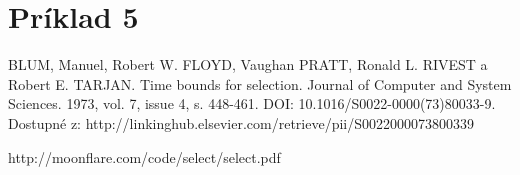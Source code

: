 \documentclass[paper=a4, fontsize=11pt]{scrartcl} %
\numberwithin{equation}{section} %
\numberwithin{figure}{section} %
\numberwithin{table}{section} %
\begin{document}
\pagebreak

\section*{Príklad 5}
\begin{thebibliography}{1}
 BLUM, Manuel, Robert W. FLOYD, Vaughan PRATT, Ronald L. RIVEST a Robert E. TARJAN.
Time bounds for selection.
Journal of Computer and System Sciences. 1973, vol. 7, issue 4, s. 448-461.
DOI: 10.1016/S0022-0000(73)80033-9.
Dostupné z: http://linkinghub.elsevier.com/retrieve/pii/S0022000073800339

 http://moonflare.com/code/select/select.pdf
\end{thebibliography}
\end{document}
